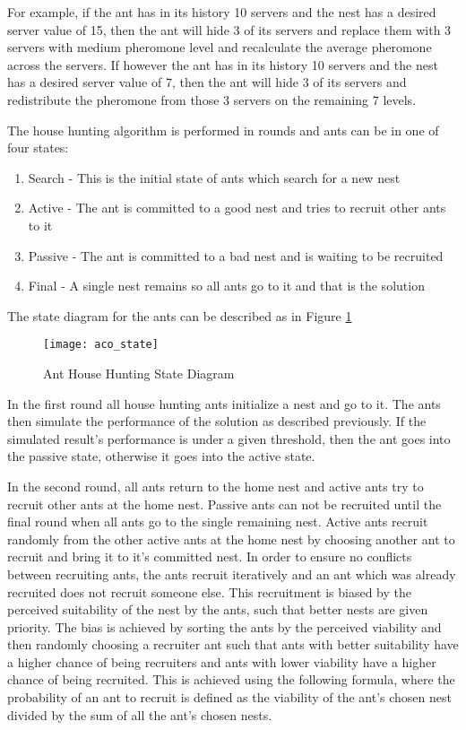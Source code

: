 \documentclass[conference]{IEEEtran}
\begin{document}
For example, if the ant has in its history 10 servers and the nest has a desired server value of 15, then the ant will hide 3 of its servers and replace them with 3 servers with medium pheromone level and recalculate the average pheromone across the servers. If however the ant has in its history 10 servers and the nest has a desired server value of 7, then the ant will hide 3 of its servers and redistribute the pheromone from those 3 servers on the remaining 7 levels.

The house hunting algorithm is performed in rounds and ants can be in one of four states:

\begin{enumerate}
	\item Search - This is the initial state of ants which search for a new nest
	\item Active - The ant is committed to a good nest and tries to recruit other ants to it
	\item Passive - The ant is committed to a bad nest and is waiting to be recruited
	\item Final - A single nest remains so all ants go to it and that is the solution
\end{enumerate}

The state diagram for the ants can be described as in Figure \ref{fig:anthousehuntingstate}

\begin{figure}
	\centering
	\texttt{[image: aco\_state]}
	\caption{Ant House Hunting State Diagram}
	\label{fig:anthousehuntingstate}
\end{figure}

In the first round all house hunting ants initialize a nest and go to it. The ants then simulate the performance of the solution as described previously. If the simulated result's performance is under a given threshold, then the ant goes into the passive state, otherwise it goes into the active state.

In the second round, all ants return to the home nest and active ants try to recruit other ants at the home nest. Passive ants can not be recruited until the final round when all ants go to the single remaining nest. Active ants recruit randomly from the other active ants at the home nest by choosing another ant to recruit and bring it to it's committed nest. In order to ensure no conflicts between recruiting ants, the ants recruit iteratively and an ant which was already recruited does not recruit someone else. This recruitment is biased by the perceived suitability of the nest by the ants, such that better nests are given priority. The bias is achieved by sorting the ants by the perceived viability and then randomly choosing a recruiter ant such that ants with better suitability have a higher chance of being recruiters and ants with lower viability have a higher chance of being recruited. This is achieved using the following formula, where the probability of an ant to recruit is defined as the viability of the ant's chosen nest divided by the sum of all the ant's chosen nests.
\end{document}
